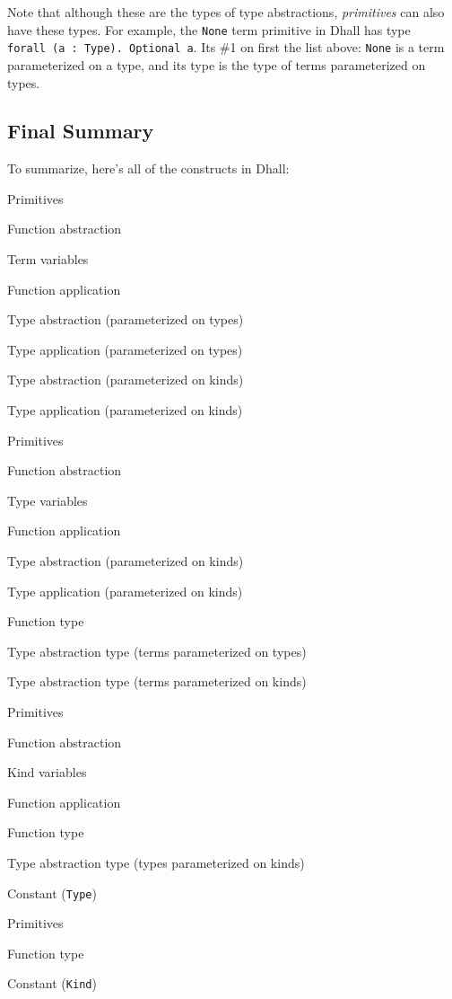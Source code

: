 \documentclass[]{article}
\begin{document}
Note that although these are the types of type abstractions, \emph{primitives}
can also have these types. For example, the \texttt{None} term primitive in
Dhall has type \texttt{forall\ (a\ :\ Type).\ Optional\ a}. Its \#1 on first the
list above: \texttt{None} is a term parameterized on a type, and its type is the
type of terms parameterized on types.

\subsection{Final Summary}\label{final-summary}

To summarize, here's all of the constructs in Dhall:

\begin{description}
\tightlist
\item[Term]
Primitives

Function abstraction

Term variables

Function application

Type abstraction (parameterized on types)

Type application (parameterized on types)

Type abstraction (parameterized on kinds)

Type application (parameterized on kinds)
\item[Type]
Primitives

Function abstraction

Type variables

Function application

Type abstraction (parameterized on kinds)

Type application (parameterized on kinds)

Function type

Type abstraction type (terms parameterized on types)

Type abstraction type (terms parameterized on kinds)
\item[Kind]
Primitives

Function abstraction

Kind variables

Function application

Function type

Type abstraction type (types parameterized on kinds)

Constant (\texttt{Type})
\item[Sort]
Primitives

Function type

Constant (\texttt{Kind})
\end{description}
\end{document}
